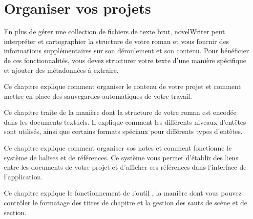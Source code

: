 \documentclass[a4paper,11pt,french]{sphinxmanual}
\begin{document}
\section{Organiser vos projets}
\label{\detokenize{int_overview:organising-your-projects}}
\sphinxAtStartPar
En plus de gérer une collection de fichiers de texte brut, novelWriter peut interpréter et cartographier la structure de votre roman et vous fournir des informations supplémentaires sur son déroulement et son contenu. Pour bénéficier de ces fonctionnalités, vous devez structurer votre texte d’une manière spécifique et ajouter des métadonnées à extraire.
\begin{description}
\sphinxAtStartPar
Ce chapitre explique comment organiser le contenu de votre projet et comment mettre en place des sauvegardes automatiques de votre travail.

\sphinxAtStartPar
Ce chapitre traite de la manière dont la structure de votre roman est encodée dans les documents textuels. Il explique comment les différents niveaux d’en\sphinxhyphen{}têtes sont utilisés, ainsi que certains formats spéciaux pour différents types d’en\sphinxhyphen{}têtes.

\sphinxAtStartPar
Ce chapitre explique comment organiser vos notes et comment fonctionne le système de balises et de références. Ce système vous permet d’établir des liens entre les documents de votre projet et d’afficher ces références dans l’interface de l’application.

\sphinxAtStartPar
Ce chapitre explique le fonctionnement de l’outil , la manière dont vous pouvez contrôler le formatage des titres de chapitre et la gestion des sauts de scène et de section.

\end{description}
\end{document}
